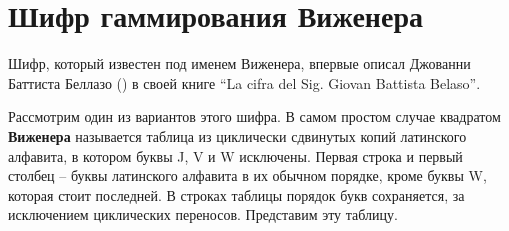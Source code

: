 \section{Шифр гаммирования Виженера}

Шифр, который известен под именем Виженера, впервые описал Джованни Баттиста Беллазо () в своей книге \foreignlanguage{italian}{``La cifra del Sig. Giovan Battista Belaso''}.

Рассмотрим один из вариантов этого шифра. В самом простом случае квадратом \textbf{Виженера} называется таблица из циклически сдвинутых копий латинского алфавита, в котором буквы J, V и W исключены. Первая строка и первый столбец -- буквы латинского алфавита в их обычном порядке, кроме буквы W, которая стоит последней. В строках таблицы порядок букв сохраняется, за исключением циклических переносов. Представим эту таблицу.

